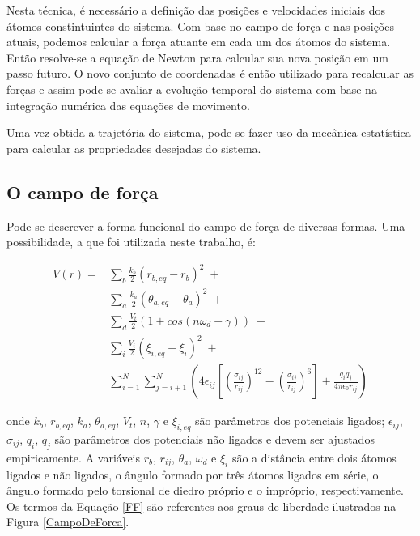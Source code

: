 
Nesta técnica, é necessário a definição das posições e velocidades iniciais dos átomos constintuintes do sistema.
Com base no campo de força e nas posições atuais, podemos calcular a força atuante em cada um dos átomos do sistema.
Então resolve-se a equação de Newton para calcular sua nova posição em um passo futuro.
O novo conjunto de coordenadas é então utilizado para recalcular as forças e assim pode-se avaliar a evolução temporal do sistema com base na integração numérica das equações de movimento\cite{Frenkel2002}.

Uma vez obtida a trajetória do sistema, pode-se fazer uso da mecânica estatística para calcular as propriedades desejadas do sistema. 

\subsection{O campo de força}

Pode-se descrever a forma funcional do campo de força de diversas formas.
Uma possibilidade, a que foi utilizada neste trabalho, é\cite{Leach2001}:

\begin{equation}
\begin{aligned}
V(r) = &\sum_{b} \frac{k_{b}}{2}(r_{b,eq}-r_{b})^2 \;+\\
       &\sum_{a} \frac{k_{a}}{2}(\theta_{a,eq}-\theta_{a})^2\;+\\
       &\sum_{d} \frac{V_t}{2}(1+cos(n\omega_{d}+\gamma))\;+\\
       &\sum_{i} \frac{V_i}{2}(\xi_{i,eq} - \xi_i)^2\;+\\
       &\sum_{i=1}^N \sum_{j=i+1}^N \left(4\epsilon_{ij}\left[\left(\frac{\sigma_{ij}}{r_{ij}}\right)^{12} - \left(\frac{\sigma_{ij}}{r_{ij}}\right)^{6}\right] + \frac{q_i q_j}{4\pi \epsilon_0 r_{ij}} \right)
\end{aligned}
\label{FF}
\end{equation}

onde $k_{b}$, $r_{b,eq}$, $k_{a}$, $\theta_{a,eq}$, $V_t$, $n$, $\gamma$ e $\xi_{i,eq}$ são parâmetros dos potenciais ligados; $\epsilon_{ij}$, $\sigma_{ij}$, $q_i$, $q_j$ são parâmetros dos potenciais não ligados e devem ser ajustados empiricamente.
A variáveis $r_{b}$, $r_{ij}$, $\theta_{a}$, $\omega_{d}$ e $\xi_{i}$ são a distância entre dois átomos ligados e não ligados, o ângulo formado por três átomos ligados em série, o ângulo formado pelo torsional de diedro próprio e o impróprio, respectivamente.
Os termos da Equação \ref{FF} são referentes aos graus de liberdade ilustrados na Figura \ref{CampoDeForca}.

